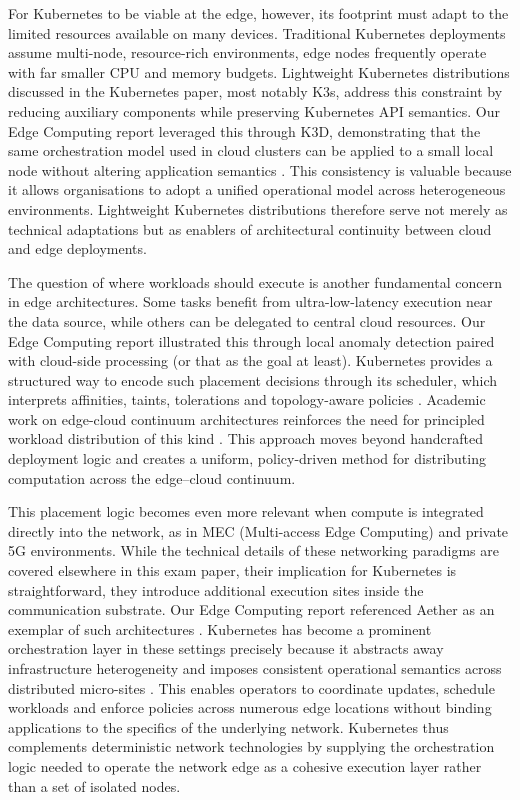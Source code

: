 For Kubernetes to be viable at the edge, however, its footprint must adapt to the limited resources available on many devices. Traditional Kubernetes deployments assume multi-node, resource-rich environments, edge nodes frequently operate with far smaller CPU and memory budgets. Lightweight Kubernetes distributions discussed in the Kubernetes paper, most notably K3s, address this constraint by reducing auxiliary components while preserving Kubernetes API semantics. Our Edge Computing report leveraged this through K3D, demonstrating that the same orchestration model used in cloud clusters can be applied to a small local node without altering application semantics \cite{edge_computing_report}. This consistency is valuable because it allows organisations to adopt a unified operational model across heterogeneous environments. Lightweight Kubernetes distributions therefore serve not merely as technical adaptations but as enablers of architectural continuity between cloud and edge deployments.

The question of where workloads should execute is another fundamental concern in edge architectures. Some tasks benefit from ultra-low-latency execution near the data source, while others can be delegated to central cloud resources. Our Edge Computing report illustrated this through local anomaly detection paired with cloud-side processing (or that as the goal at least)\cite{edge_computing_report}. Kubernetes provides a structured way to encode such placement decisions through its scheduler, which interprets affinities, taints, tolerations and topology-aware policies \cite{k8s_architecture}. Academic work on edge-cloud continuum architectures reinforces the need for principled workload distribution of this kind \cite{satya_cloudlets}. This approach moves beyond handcrafted deployment logic and creates a uniform, policy-driven method for distributing computation across the edge–cloud continuum.

This placement logic becomes even more relevant when compute is integrated directly into the network, as in MEC (Multi-access Edge Computing) and private 5G environments. While the technical details of these networking paradigms are covered elsewhere in this exam paper, their implication for Kubernetes is straightforward, they introduce additional execution sites inside the communication substrate. Our Edge Computing report referenced Aether as an exemplar of such architectures \cite{edge_computing_report}. Kubernetes has become a prominent orchestration layer in these settings precisely because it abstracts away infrastructure heterogeneity and imposes consistent operational semantics across distributed micro-sites \cite{kubeedge_mec}. This enables operators to coordinate updates, schedule workloads and enforce policies across numerous edge locations without binding applications to the specifics of the underlying network. Kubernetes thus complements deterministic network technologies by supplying the orchestration logic needed to operate the network edge as a cohesive execution layer rather than a set of isolated nodes.

